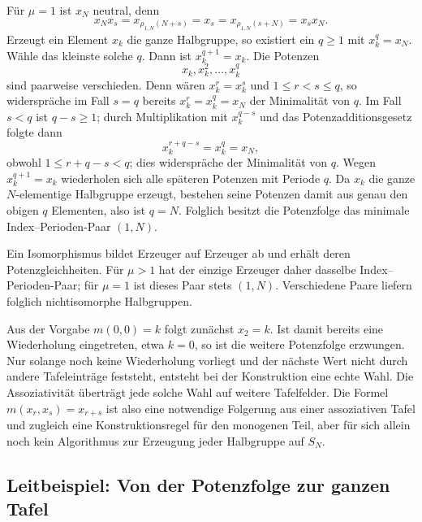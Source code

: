 \documentclass[main.tex]{subfiles}
\begin{document}
Für \(\mu=1\) ist \(x_N\) neutral, denn
\[
  x_Nx_s=x_{\rho_{1,N}(N+s)}=x_s
  =x_{\rho_{1,N}(s+N)}=x_sx_N.
\]
Erzeugt ein Element \(x_k\) die ganze Halbgruppe, so existiert ein
\(q\geq1\) mit \(x_k^q=x_N\). Wähle das kleinste solche \(q\). Dann ist
\(x_k^{q+1}=x_k\). Die Potenzen
\[
  x_k,x_k^2,\ldots,x_k^q
\]
sind paarweise verschieden. Denn wären \(x_k^r=x_k^s\) und
\(1\leq r<s\leq q\), so widerspräche im Fall
\(s=q\) bereits \(x_k^r=x_k^q=x_N\) der Minimalität von \(q\). Im Fall
\(s<q\) ist \(q-s\geq1\); durch Multiplikation mit \(x_k^{q-s}\) und das
Potenzadditionsgesetz folgte dann
\[
  x_k^{r+q-s}=x_k^q=x_N,
\]
obwohl \(1\leq r+q-s<q\); dies widerspräche der Minimalität von \(q\).
Wegen \(x_k^{q+1}=x_k\) wiederholen sich alle späteren Potenzen mit Periode
\(q\). Da \(x_k\) die ganze \(N\)-elementige Halbgruppe erzeugt, bestehen
seine Potenzen damit aus genau den obigen \(q\) Elementen, also ist \(q=N\).
Folglich besitzt die Potenzfolge das minimale Index--Perioden-Paar
\((1,N)\).

Ein Isomorphismus bildet Erzeuger auf Erzeuger ab und erhält deren
Potenzgleichheiten.  Für \(\mu>1\) hat der einzige Erzeuger daher dasselbe
Index--Perioden-Paar; für \(\mu=1\) ist dieses Paar stets \((1,N)\).
Verschiedene Paare liefern folglich nichtisomorphe Halbgruppen.

\begin{remark}
Aus der Vorgabe \(m(0,0)=k\) folgt zunächst \(x_2=k\).  Ist damit bereits
eine Wiederholung eingetreten, etwa \(k=0\), so ist die weitere Potenzfolge
erzwungen.  Nur solange noch keine Wiederholung vorliegt und der nächste Wert
nicht durch andere Tafeleinträge feststeht, entsteht bei der Konstruktion
eine echte Wahl.  Die Assoziativität überträgt jede solche Wahl auf weitere
Tafelfelder.  Die Formel \(m(x_r,x_s)=x_{r+s}\) ist also eine notwendige
Folgerung aus einer assoziativen Tafel und zugleich eine Konstruktionsregel
für den monogenen Teil, aber für sich allein noch kein Algorithmus zur
Erzeugung jeder Halbgruppe auf \(S_N\).
\end{remark}


\subsection{Leitbeispiel: Von der Potenzfolge zur ganzen Tafel}
\end{document}
